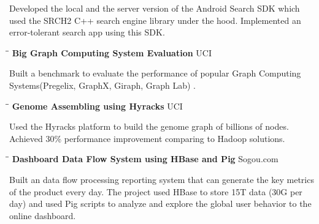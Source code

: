 \documentclass{res}
\begin{document}
\begin{resume}
\begin{tabbing}
   \end{tabbing}\vspace{-30pt}      %
   Developed the local and the server version of the Android Search SDK which used the SRCH2 C++ search engine library under the hood. Implemented an error-tolerant search app using this SDK.
   \vspace{-0.1in}
   \begin{tabbing}
   \hspace{2in}\= \hspace{3in}\= \kill %
    {\bf Big Graph Computing System Evaluation}\> \>UCI     \\
   \end{tabbing}\vspace{-30pt}      %
   Built a benchmark to evaluate the performance of popular Graph Computing Systems(Pregelix, GraphX, Giraph, Graph Lab)  . %
%
   \vspace{-0.1in}
   \begin{tabbing}
   \hspace{2in}\= \hspace{3in}\= \kill %
    {\bf Genome Assembling using Hyracks }\> \>UCI     \\
   \end{tabbing}\vspace{-30pt}      %
   Used the Hyracks platform to build the genome graph of billions of nodes. Achieved 30\% performance improvement comparing to Hadoop solutions.
%
   \vspace{-0.1in}
   \begin{tabbing}
   \hspace{2in}\= \hspace{3in}\= \kill %
    {\bf Dashboard Data Flow System using HBase and Pig}\> \>Sogou.com     \\
   \end{tabbing}\vspace{-30pt}      %
   Built an data flow processing reporting system that can generate the key metrics of the product every day. 
   The project used HBase to store 15T data (30G per day)  and used Pig scripts to analyze and explore the global user behavior to the online dashboard. %

\end{resume}
\end{document}
